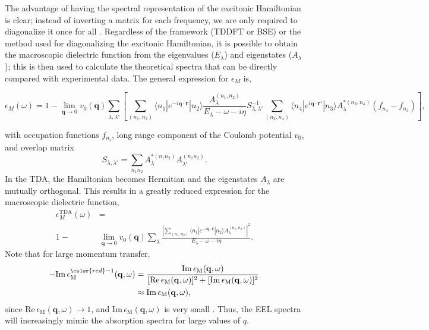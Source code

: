 \documentclass[aps,prb,10pt,showpacs,superscriptaddress,twocolumn,notitlepage]{revtex4-1}
\begin{document}
The advantage of having the spectral representation of the
excitonic Hamiltonian is clear; instead of inverting a matrix for each
frequency, we are only required to diagonalize it once for all
\cite{sottilethesis2003}. Regardless of the framework (TDDFT or BSE) or the
method used for diagonalizing the excitonic Hamiltonian, it is possible to
obtain the macroscopic dielectric function from the eigenvalues ($E_{\lambda}$)
and eigenstates ($A_{\lambda}$); \cite{onidaRMP02} this is then used to
calculate the theoretical spectra that can be directly compared with
experimental data. The general expression for $\epsilon_{M}$ is,
\begin{widetext}
\begin{equation*}\label{eq:totalEm}
\epsilon_M(\omega)
= 1 - \lim_{\mathbf{q}\rightarrow 0}v_0(\mathbf{q})
\sum_{\lambda,\lambda'}\left[
\sum_{(n_{1},n_{2})}
\langle n_{1}|e^{-i\mathbf{q}\cdot\mathbf{r}}|n_{2}\rangle
\frac{A_{\lambda}^{(n_{1},n_{2})}}{E_{\lambda}-\omega-i\eta}
S_{\lambda,\lambda'}^{-1}
\sum_{(n_{3},n_{4})}
\langle n_{4}|e^{i \mathbf{q}\cdot \mathbf{r'}}|n_{3}\rangle
A_{\lambda}^{*(n_{3},n_{4})} (f_{n_{4}}-f_{n_{3}})
\right],
\end{equation*}
\end{widetext}
with occupation functions $f_{n_i}$, long range component of the Coulomb
potential $v_0$, and overlap matrix
\begin{equation*}
S_{\lambda,\lambda'} = 
\sum_{n_{1}n_{2}}A_{\lambda}^{*(n_{1}n_{2})}A_{\lambda'}^{(n_{1}n_{2})}.
\end{equation*}
In the TDA, the Hamiltonian becomes Hermitian and the eigenstates $A_{\lambda}$
are mutually orthogonal. This results in a greatly reduced expression for the
macroscopic dielectric function,
\begin{equation*}\label{eq:TDAEm}
\begin{split}
\epsilon^{\textrm{TDA}}_M(\omega) &=\\
1 -& \lim_{\mathbf{q}\rightarrow 0}v_0(\mathbf{q})
\sum_{\lambda}
\frac{ \left | \sum_{(n_{1},n_{2})}
\langle n_{1} |
e^{-i\mathbf{q}\cdot \mathbf{r}}
| n_{2} \rangle
A_{\lambda}^{(n_{1},n_{2})}\right |^2 }{E_{\lambda} - \omega - i\eta}
.
\end{split}
\end{equation*}
Note that for large momentum transfer,
\begin{equation}\label{eq:eels}
\begin{split}
-\mathrm{Im}\,\epsilon^{{\color{red}-1}}_{\mathrm{M}}(\mathbf{q}, \omega)
&= \frac{\mathrm{Im}\,\epsilon_{\mathrm{M}}(\mathbf{q}, \omega)}
        {[\mathrm{Re}\,\epsilon_{\mathrm{M}}(\mathbf{q}, \omega)]^{2} +
         [\mathrm{Im}\,\epsilon_{\mathrm{M}}(\mathbf{q}, \omega)]^{2}}\\
&\approx \mathrm{Im}\,\epsilon_{\mathrm{M}}(\mathbf{q}, \omega),
\end{split}
\end{equation}
since $\mathrm{Re}\,\epsilon_{\mathrm{M}}(\mathbf{q}, \omega) \rightarrow 1$,
and $\mathrm{Im}\,\epsilon_{\mathrm{M}}(\mathbf{q}, \omega)$ is very small
\cite{gattiPRB13}. Thus, the EEL spectra will increasingly mimic the absorption
spectra for large values of $q$.
\end{document}
